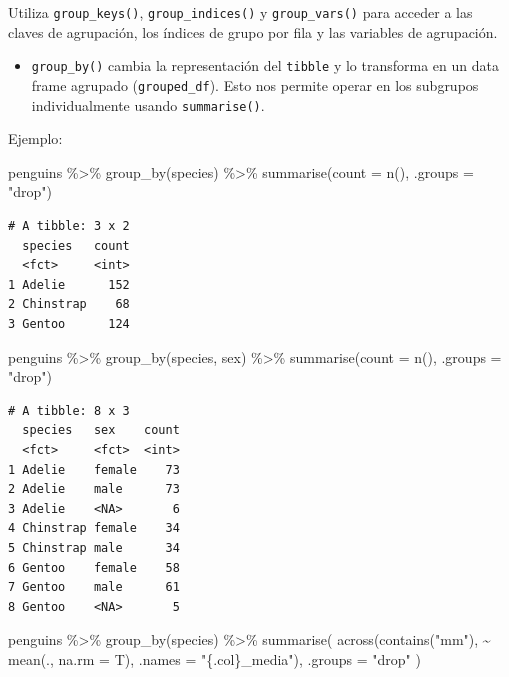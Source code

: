 \documentclass[
  letterpaper,
  DIV=11,
  numbers=noendperiod]{scrreprt}
\newenvironment{Shaded}{\begin{snugshade}}{\end{snugshade}}
\newcommand{\AttributeTok}[1]{\textcolor[rgb]{0.40,0.45,0.13}{#1}}
\newcommand{\FunctionTok}[1]{\textcolor[rgb]{0.28,0.35,0.67}{#1}}
\newcommand{\NormalTok}[1]{\textcolor[rgb]{0.00,0.23,0.31}{#1}}
\newcommand{\SpecialCharTok}[1]{\textcolor[rgb]{0.37,0.37,0.37}{#1}}
\newcommand{\StringTok}[1]{\textcolor[rgb]{0.13,0.47,0.30}{#1}}
\providecommand{\tightlist}{%
  \setlength{\itemsep}{0pt}\setlength{\parskip}{0pt}}\usepackage{longtable,booktabs,array}
\begin{document}
Utiliza \texttt{group\_keys()}, \texttt{group\_indices()} y
\texttt{group\_vars()} para acceder a las claves de agrupación, los
índices de grupo por fila y las variables de agrupación.

\begin{itemize}
\tightlist
\item
  \texttt{group\_by()} cambia la representación del \texttt{tibble} y lo
  transforma en un data frame agrupado (\texttt{grouped\_df}). Esto nos
  permite operar en los subgrupos individualmente usando
  \texttt{summarise()}.
\end{itemize}

{Ejemplo}:

\begin{Shaded}
\begin{Highlighting}[]
\NormalTok{penguins }\SpecialCharTok{\%\textgreater{}\%} \FunctionTok{group\_by}\NormalTok{(species) }\SpecialCharTok{\%\textgreater{}\%} 
  \FunctionTok{summarise}\NormalTok{(}\AttributeTok{count =} \FunctionTok{n}\NormalTok{(), }\AttributeTok{.groups =} \StringTok{"drop"}\NormalTok{)}
\end{Highlighting}
\end{Shaded}

\begin{verbatim}
# A tibble: 3 x 2
  species   count
  <fct>     <int>
1 Adelie      152
2 Chinstrap    68
3 Gentoo      124
\end{verbatim}

\begin{Shaded}
\begin{Highlighting}[]
\NormalTok{penguins }\SpecialCharTok{\%\textgreater{}\%} \FunctionTok{group\_by}\NormalTok{(species, sex) }\SpecialCharTok{\%\textgreater{}\%} \FunctionTok{summarise}\NormalTok{(}\AttributeTok{count =} \FunctionTok{n}\NormalTok{(), }\AttributeTok{.groups =} \StringTok{"drop"}\NormalTok{)}
\end{Highlighting}
\end{Shaded}

\begin{verbatim}
# A tibble: 8 x 3
  species   sex    count
  <fct>     <fct>  <int>
1 Adelie    female    73
2 Adelie    male      73
3 Adelie    <NA>       6
4 Chinstrap female    34
5 Chinstrap male      34
6 Gentoo    female    58
7 Gentoo    male      61
8 Gentoo    <NA>       5
\end{verbatim}

\begin{Shaded}
\begin{Highlighting}[]
\NormalTok{penguins }\SpecialCharTok{\%\textgreater{}\%}
  \FunctionTok{group\_by}\NormalTok{(species) }\SpecialCharTok{\%\textgreater{}\%}
  \FunctionTok{summarise}\NormalTok{(}
    \FunctionTok{across}\NormalTok{(}\FunctionTok{contains}\NormalTok{(}\StringTok{"mm"}\NormalTok{), }\SpecialCharTok{\textasciitilde{}} \FunctionTok{mean}\NormalTok{(., }\AttributeTok{na.rm =}\NormalTok{ T), }\AttributeTok{.names =} \StringTok{"\{.col\}\_media"}\NormalTok{),}
    \AttributeTok{.groups =} \StringTok{"drop"}
\NormalTok{  )}
\end{Highlighting}
\end{Shaded}
\end{document}
